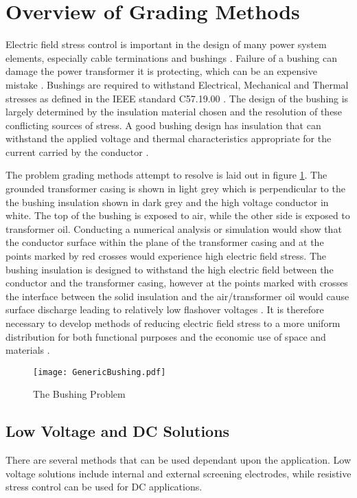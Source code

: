 \section{Overview of Grading Methods}
Electric field stress control is important in the design of many power system elements, especially cable terminations and bushings \cite{james2008condition}.
Failure of a bushing can damage the power transformer it is protecting, which can be an expensive mistake \cite{warne2005newnes}.
Bushings are required to withstand Electrical, Mechanical and Thermal stresses as defined in the IEEE standard C57.19.00 \cite{1440990}.
The design of the bushing is largely determined by the insulation material chosen and the resolution of these conflicting sources of stress.
A good bushing design has insulation that can withstand the applied voltage and thermal characteristics appropriate for the current carried by the conductor \cite{harlow2004electric}.

The problem grading methods attempt to resolve is laid out in figure \ref{figure:problem}.
The grounded transformer casing is shown in light grey which is perpendicular to the the bushing insulation shown in dark grey and the high voltage conductor in white.
The top of the bushing is exposed to air, while the other side is exposed to transformer oil.
Conducting a numerical analysis or simulation would show that the conductor surface within the plane of the transformer casing and at the points marked by red crosses would experience high electric field stress.
The bushing insulation is designed to withstand the high electric field between the conductor and the transformer casing, however at the points marked with crosses the interface between the solid insulation and the air/transformer oil would cause surface discharge leading to relatively low flashover voltages \cite{kuffel2000high}.
It is therefore necessary to develop methods of reducing electric field stress to a more uniform distribution for both functional purposes and the economic use of space and materials \cite{james2008condition}.

\begin{figure}[!h]
   \centering
   \texttt{[image: GenericBushing.pdf]}
   \caption{The Bushing Problem}
   \label{figure:problem}
\end{figure}

\subsection{Low Voltage and DC Solutions}
There are several methods that can be used dependant upon the application.
Low voltage solutions include internal and external screening electrodes, while resistive stress control can be used for DC applications.

